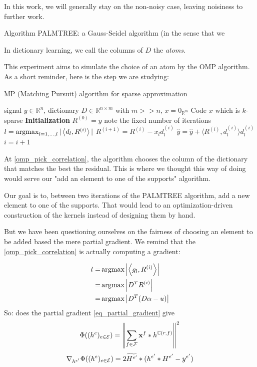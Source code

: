 In this work, we will generally stay on the non-noisy case, leaving noisiness to further work.

Algorithm PALMTREE: a Gauss-Seidel algorithm (in the sense that we 

In dictionary learning, we call the columns of $D$ the \emph{atoms}.


This experiment aims to simulate the choice of an atom by the OMP algorithm. As a short reminder, here is the step we are studying:
\begin{algorithm} %
    \caption{MP (Matching Pursuit) algorithm for sparse approximation}
  \begin{algorithmic}[1]
    \Input signal $y \in \mathbb{R}^{n}$, dictionary $D \in \mathbb{R}^{n \times m}$ with $m>>n$, $x = 0_{\mathbb{R}^m}$
    \Output Code $x$ which is $k$-sparse
    \State \textbf{Initialization} $R^{(0)} = y$
     \Comment note the fixed number of iterations
      \State $l =  \operatorname*{\arg\!\max}_{l = 1,\dots,l} |\left< d_l,R^{(i)} \right>|$ \label{omp_pick_correlation}
      \State $R^{(i+1)} = R^{(i)}-x_l d_l^{(i)}$
      \State $\hat{y} = \hat{y}+\langle R^{(i)}, d_{l}^{(i)} \rangle d_{l}^{(i)}$
      \State $i = i + 1$
    \EndWhile
  \end{algorithmic}
\end{algorithm}

At \cref{omp_pick_correlation}, the algorithm chooses the column of the dictionary that matches the best the residual. This is where we thought this way of doing would serve our "add an element to one of the supports" algorithm.

Our goal is to, between two iterations of the PALMTREE algorithm, add a new element to one of the supports. That would lead to an optimization-driven construction of the kernels instead of designing them by hand.

But we have been questioning ourselves on the fairness of choosing an element to be added based the mere partial gradient. We remind that the \ref{omp_pick_correlation} is actually computing a gradient:

\begin{align*}
l =& \operatorname*{\arg\!\max} \left|\left< g_l,R^{(i)} \right>\right| \\
=& \operatorname*{\arg\!\max} \left| D^TR^{(i)}\right| \\
=& \operatorname*{\arg\!\max} \left| D^T(D\alpha - u)\right| \\
\end{align*}
So: does the partial gradient \ref{eq_partial_gradient} give 
\begin{align*}
\Phi((h^e)_{e \in \mathcal E}) = \left\| \sum_{f\in\mathcal F} \mathbf x^f * h^{\mathbb C(r,f)} \right\|^2
\end{align*}
\begin{align*} 
\nabla_{h^{e'}}\Phi((h^e)_{e \in \mathcal E}) = 2 \widetilde{H^{e'}} * (h^{e'}*H^{e'}-y^{e'})
\end{align*} \label{eq_partial_gradient}

